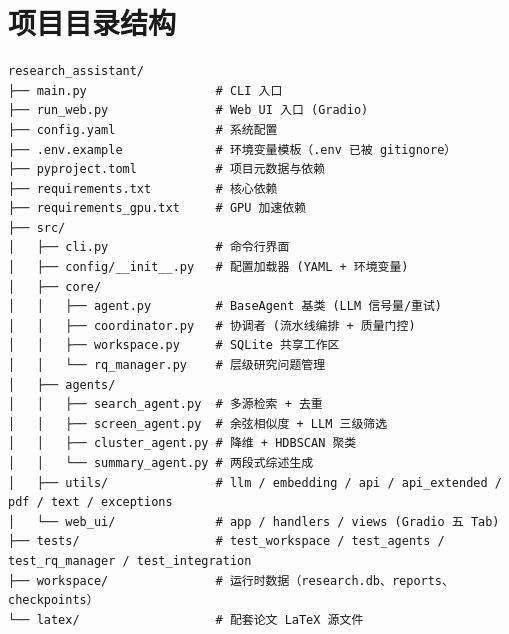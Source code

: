 \documentclass[10pt,a4paper]{article}
\begin{document}
\section{项目目录结构}
\begin{lstlisting}[basicstyle=\ttfamily\scriptsize]
research_assistant/
├── main.py                  # CLI 入口
├── run_web.py               # Web UI 入口 (Gradio)
├── config.yaml              # 系统配置
├── .env.example             # 环境变量模板（.env 已被 gitignore）
├── pyproject.toml           # 项目元数据与依赖
├── requirements.txt         # 核心依赖
├── requirements_gpu.txt     # GPU 加速依赖
├── src/
│   ├── cli.py               # 命令行界面
│   ├── config/__init__.py   # 配置加载器 (YAML + 环境变量)
│   ├── core/
│   │   ├── agent.py         # BaseAgent 基类 (LLM 信号量/重试)
│   │   ├── coordinator.py   # 协调者 (流水线编排 + 质量门控)
│   │   ├── workspace.py     # SQLite 共享工作区
│   │   └── rq_manager.py    # 层级研究问题管理
│   ├── agents/
│   │   ├── search_agent.py  # 多源检索 + 去重
│   │   ├── screen_agent.py  # 余弦相似度 + LLM 三级筛选
│   │   ├── cluster_agent.py # 降维 + HDBSCAN 聚类
│   │   └── summary_agent.py # 两段式综述生成
│   ├── utils/               # llm / embedding / api / api_extended / pdf / text / exceptions
│   └── web_ui/              # app / handlers / views (Gradio 五 Tab)
├── tests/                   # test_workspace / test_agents / test_rq_manager / test_integration
├── workspace/               # 运行时数据（research.db、reports、checkpoints）
└── latex/                   # 配套论文 LaTeX 源文件
\end{lstlisting}
\end{document}
